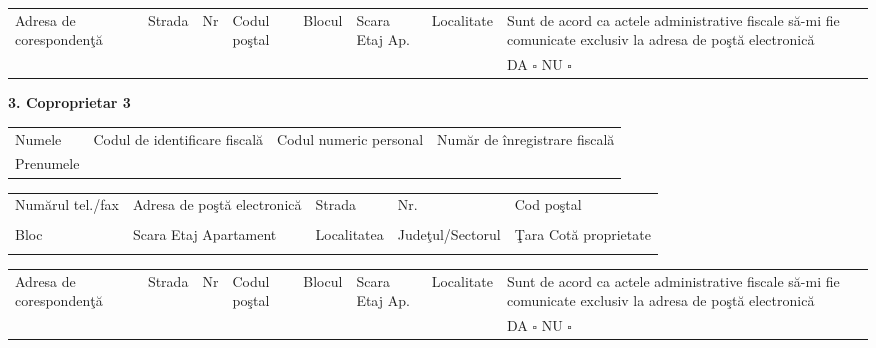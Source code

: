 \documentclass[8pt,a4paper,landscape]{extarticle}
\newcommand{\fillline}[1][6cm]{\underline{\hspace{#1}}}
\newcommand{\checkboxempty}{$\square$}
\begin{document}
\begin{tabularx}{\textwidth}{|m{2.5cm}|X|X|X|X|X|X|m{4cm}|}
\hline
\multirow{2}{2.5cm}{Adresa de corespondenţă} & Strada & Nr & Codul poştal & Blocul & Scara \quad Etaj \quad Ap. & Localitate & Sunt de acord ca actele administrative fiscale să-mi fie comunicate exclusiv la adresa de poştă electronică \\
& \fillline[2cm] & \fillline[1cm] & \fillline[1.5cm] & \fillline[1cm] & \fillline[2cm] & \fillline[2cm] & DA \checkboxempty \hspace{0.5cm} NU \checkboxempty \\
\hline
\end{tabularx}

\vspace{0.15cm}

\textbf{3. Coproprietar 3}\\
\begin{tabularx}{\textwidth}{|X|X|X|X|}
\hline
Numele \fillline[5cm] & Codul de identificare fiscală & Codul numeric personal & Număr de înregistrare fiscală \\
Prenumele \fillline[5cm] & \fillline[4cm] & \fillline[4cm] & \fillline[4cm] \\
\hline
\end{tabularx}

\begin{tabularx}{\textwidth}{|X|X|X|X|X|}
\hline
Numărul tel./fax & Adresa de poştă electronică & Strada & Nr. & Cod poştal \\
\fillline[3cm] & \fillline[4cm] & \fillline[4cm] & \fillline[1.5cm] & \fillline[2cm] \\
\hline
Bloc & Scara \quad Etaj \quad Apartament & Localitatea & Judeţul/Sectorul & Ţara \quad Cotă proprietate \\
\fillline[1.5cm] & \fillline[3cm] & \fillline[3cm] & \fillline[3cm] & \fillline[3cm] \\
\hline
\end{tabularx}

\begin{tabularx}{\textwidth}{|m{2.5cm}|X|X|X|X|X|X|m{4cm}|}
\hline
\multirow{2}{2.5cm}{Adresa de corespondenţă} & Strada & Nr & Codul poştal & Blocul & Scara \quad Etaj \quad Ap. & Localitate & Sunt de acord ca actele administrative fiscale să-mi fie comunicate exclusiv la adresa de poştă electronică \\
& \fillline[2cm] & \fillline[1cm] & \fillline[1.5cm] & \fillline[1cm] & \fillline[2cm] & \fillline[2cm] & DA \checkboxempty \hspace{0.5cm} NU \checkboxempty \\
\hline
\end{tabularx}
\end{document}
